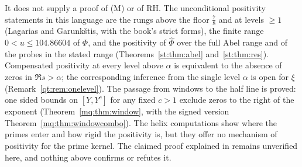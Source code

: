 It does not supply a proof of (M) or of RH. The unconditional positivity statements in this language are the rungs above the floor $\frac78$ and at levels $\ge1$ (Lagarias and Garunk\v{s}tis, with the book's strict forms), the finite range $0<u\le104.86604$ of $\Phi$, and the positivity of $\hat\Phi$ over the full Abel range and of the probes in the stated range (Theorems~\ref{st:thm:abel} and~\ref{st:thm:res}). Compensated positivity at every level above $\alpha$ is equivalent to the absence of zeros in $\Re s>\alpha$; the corresponding inference from the single level $\alpha$ is open for $\xi$ (Remark~\ref{qt:rem:onelevel}). The passage from windows to the half line is proved: one sided bounds on $[Y,Y^c]$ for any fixed $c>1$ exclude zeros to the right of the exponent (Theorem~\ref{mq:thm:window}, with the signed version Theorem~\ref{mq:thm:windowcombo}). The helix computations show where the primes enter and how rigid the positivity is, but they offer no mechanism of positivity for the prime kernel. The claimed proof explained in \cite{Rub26} remains unverified here, and nothing above confirms or refutes it.

